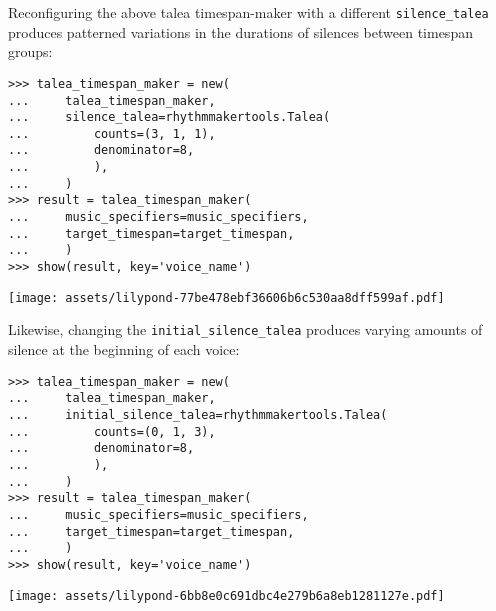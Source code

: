 \noindent Reconfiguring the above talea timespan-maker with a different
\texttt{silence\_talea} produces patterned variations in the durations of
silences between timespan groups:

\begin{comment}
<abjad>
talea_timespan_maker = new(
    talea_timespan_maker,
    silence_talea=rhythmmakertools.Talea(
        counts=(3, 1, 1),
        denominator=8,
        ),
    )
result = talea_timespan_maker(
    music_specifiers=music_specifiers,
    target_timespan=target_timespan,
    )
show(result, key='voice_name')
</abjad>
\end{comment}

\begin{abjadbookoutput}
\begin{singlespacing}
\vspace{-0.5\baselineskip}
\begin{verbatim}
>>> talea_timespan_maker = new(
...     talea_timespan_maker,
...     silence_talea=rhythmmakertools.Talea(
...         counts=(3, 1, 1),
...         denominator=8,
...         ),
...     )
>>> result = talea_timespan_maker(
...     music_specifiers=music_specifiers,
...     target_timespan=target_timespan,
...     )
>>> show(result, key='voice_name')
\end{verbatim}
\noindent\texttt{[image: assets/lilypond-77be478ebf36606b6c530aa8dff599af.pdf]}
\end{singlespacing}
\end{abjadbookoutput}

\noindent Likewise, changing the \texttt{initial\_silence\_talea} produces
varying amounts of silence at the beginning of each voice:

\begin{comment}
<abjad>
talea_timespan_maker = new(
    talea_timespan_maker,
    initial_silence_talea=rhythmmakertools.Talea(
        counts=(0, 1, 3),
        denominator=8,
        ),
    )
result = talea_timespan_maker(
    music_specifiers=music_specifiers,
    target_timespan=target_timespan,
    )
show(result, key='voice_name')
</abjad>
\end{comment}

\begin{abjadbookoutput}
\begin{singlespacing}
\vspace{-0.5\baselineskip}
\begin{verbatim}
>>> talea_timespan_maker = new(
...     talea_timespan_maker,
...     initial_silence_talea=rhythmmakertools.Talea(
...         counts=(0, 1, 3),
...         denominator=8,
...         ),
...     )
>>> result = talea_timespan_maker(
...     music_specifiers=music_specifiers,
...     target_timespan=target_timespan,
...     )
>>> show(result, key='voice_name')
\end{verbatim}
\noindent\texttt{[image: assets/lilypond-6bb8e0c691dbc4e279b6a8eb1281127e.pdf]}
\end{singlespacing}
\end{abjadbookoutput}

